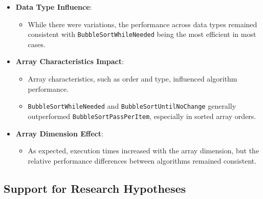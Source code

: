 \documentclass{article}
\begin{document}
\begin{itemize}
 \item \textbf{Data Type Influence}:
        \begin{itemize}
          \item While there were variations, the performance across data types remained consistent with \texttt{BubbleSortWhileNeeded} being the most efficient in most cases.
        \end{itemize}
\end{itemize}


\begin{itemize}
 \item \textbf{Array Characteristics Impact}:
        \begin{itemize}
          \item Array characteristics, such as order and type, influenced algorithm performance.
          \item \texttt{BubbleSortWhileNeeded} and \texttt{BubbleSortUntilNoChange} generally outperformed \texttt{BubbleSortPassPerItem}, especially in sorted array orders.
        \end{itemize}
\end{itemize}

\begin{itemize}
 \item \textbf{Array Dimension Effect}:
        \begin{itemize}
          \item As expected, execution times increased with the array dimension, but the relative performance differences between algorithms remained consistent.
        \end{itemize}
\end{itemize}

\subsection*{Support for Research Hypotheses}
\end{document}
